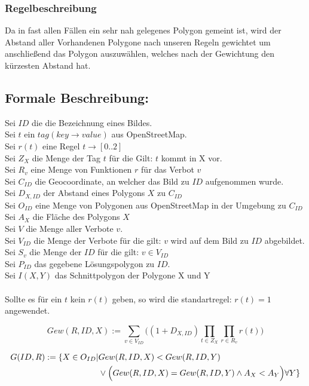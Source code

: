 \subsubsection{Regelbeschreibung}
Da in fast allen Fällen ein sehr nah gelegenes Polygon gemeint ist, wird der Abstand aller Vorhandenen Polygone nach unseren Regeln gewichtet
um anschließend das Polygon auszuwählen, welches nach der Gewichtung den kürzesten Abstand hat.


\subsection{Formale Beschreibung:}
Sei $ID$ die die Bezeichnung eines Bildes.\\
Sei $t$ ein $tag (key \to value)$ aus OpenStreetMap.\\
Sei $r(t)$ eine Regel $t \to [0..2]$ \\
Sei $Z_{X}$ die Menge der Tag $t$ für die Gilt: $t$ kommt in X vor. \\
Sei $R_v$ eine Menge von Funktionen $r$ für das Verbot $v$\\
Sei $C_{ID}$ die Geocoordinate, an welcher das Bild zu $ID$ aufgenommen wurde. \\
Sei $D_{X,ID}$ der Abstand eines Polygons $X$ zu $C_{ID}$ \\
Sei $O_{ID}$ eine Menge von Polygonen aus OpenStreetMap in der Umgebung zu $C_{ID}$\\
Sei $A_{X}$ die Fläche des Polygons $X$\\
Sei $V$ die Menge aller Verbote $v$.\\
Sei $V_{ID}$ die Menge der Verbote für die gilt: $v$ wird auf dem Bild zu $ID$ abgebildet.\\
Sei $S_{v}$ die Menge der $ID$ für die gilt: $v \in V_{ID}$\\
Sei $P_{ID}$ das gegebene Lösungspolygon zu $ID$.\\
Sei $I(X,Y)$ das Schnittpolygon der Polygone X und Y\\
\\
Sollte es für ein $t$ kein $r(t)$ geben, so wird die standartregel:
$r(t) = 1$ angewendet.

\begin{equation}
Gew(R,ID,X) := \sum_{v \in V_{ID}} \Big((1 + D_{X,ID})\prod_{t \in Z_X} \prod_{r \in R_v} r(t)\Big)
\end{equation}

\begin{align}
G(ID,R) := \{X \in O_{ID} | & Gew(R,ID,X) < Gew(R,ID,Y)\\
& \lor \Big(Gew(R,ID,X)=Gew(R,ID,Y) \land A_X < A_Y\Big) \forall Y\} \notag
\end{align}


